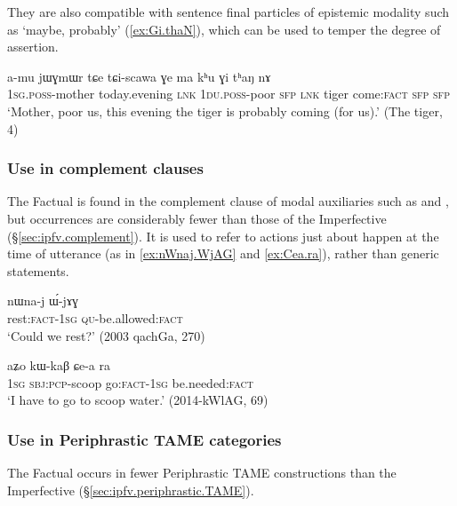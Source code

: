 They are also compatible with sentence final particles of epistemic modality such as  `maybe, probably' (\ref{ex:Gi.thaN}), which can be used to temper the degree of assertion.

\begin{exe}
\ex \label{ex:Gi.thaN}
\gll a-mu jɯɣmɯr tɕe tɕi-scawa ɣe ma kʰu ɣi tʰaŋ nɤ \\
 \textsc{1sg}.\textsc{poss}-mother today.evening \textsc{lnk}  \textsc{1du}.\textsc{poss}-poor \textsc{sfp} \textsc{lnk} tiger  come:\textsc{fact} \textsc{sfp} \textsc{sfp} \\
\glt `Mother, poor us, this evening the tiger is probably coming (for us).' (The tiger, 4)
 \end{exe}

\subsubsection{Use in complement clauses} \label{sec:fact.complement}
The Factual is found in the complement clause of modal auxiliaries such as  and , but occurrences are considerably fewer than those of the Imperfective (§\ref{sec:ipfv.complement}). It is used to refer to actions just about happen at the time of utterance (as in \ref{ex:nWnaj.WjAG} and \ref{ex:Cea.ra}), rather than generic statements.


\begin{exe}
\ex \label{ex:nWnaj.WjAG}
\gll nɯna-j ɯ́-jɤɣ \\
rest:\textsc{fact}-\textsc{1sg} \textsc{qu}-be.allowed:\textsc{fact} \\
\glt `Could we rest?' (2003 qachGa, 270)
\end{exe}

\begin{exe}
\ex \label{ex:Cea.ra}
\gll aʑo kɯ-kaβ ɕe-a ra \\
\textsc{1sg} \textsc{sbj}:\textsc{pcp}-scoop go:\textsc{fact}-\textsc{1sg} be.needed:\textsc{fact} \\
\glt `I have to go to scoop water.' (2014-kWlAG, 69)
\end{exe} 

\subsubsection{Use in Periphrastic TAME categories} \label{sec:fact.periphrastic}
The Factual occurs in fewer Periphrastic TAME constructions than the Imperfective (§\ref{sec:ipfv.periphrastic.TAME}).

